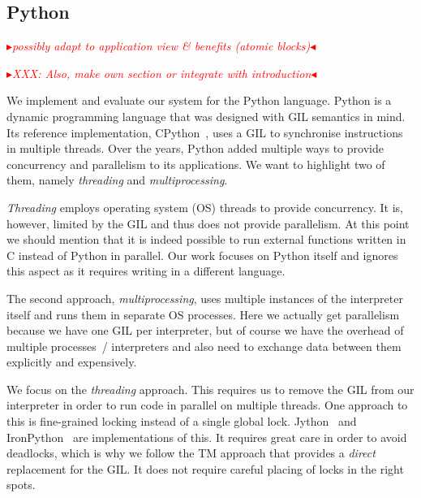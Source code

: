 \documentclass{sigplanconf}
\newcommand{\mynote}[2]{%
  \textcolor{red}{%
    \fbox{\bfseries\sffamily\scriptsize#1}%
    {\small$\blacktriangleright$\textsf{\emph{#2}}$\blacktriangleleft$}%
  }%
}
\newcommand\remi[1]{\mynote{Remi}{#1}}
\begin{document}
\subsection{Python}
\remi{possibly adapt to application view \& benefits (atomic blocks)}
\remi{XXX: Also, make own section or integrate with introduction}

We implement and evaluate our system for the Python language. Python
is a dynamic programming language that was designed with GIL semantics
in mind. Its reference implementation, CPython~\cite{cpython}, uses a
GIL to synchronise instructions in multiple threads.
Over the years, Python added multiple ways to provide concurrency and
parallelism to its applications. We want to highlight two of them,
namely \emph{threading} and \emph{multiprocessing}.

\emph{Threading} employs operating system (OS) threads to provide
concurrency. It is, however, limited by the GIL and thus does not
provide parallelism. At this point we should mention that it is indeed
possible to run external functions written in C instead of Python in
parallel. Our work focuses on Python itself and ignores this aspect as
it requires writing in a different language.

The second approach, \emph{multiprocessing}, uses multiple instances
of the interpreter itself and runs them in separate OS processes.
Here we actually get parallelism because we have one GIL per
interpreter, but of course we have the overhead of multiple processes~/
interpreters and also need to exchange data between them explicitly
and expensively.

We focus on the \emph{threading} approach. This requires us to remove
the GIL from our interpreter in order to run code in parallel on
multiple threads. One approach to this is fine-grained locking instead
of a single global lock. Jython~\cite{webjython} and
IronPython~\cite{ironpython} are implementations of this. It requires
great care in order to avoid deadlocks, which is why we follow the TM
approach that provides a \emph{direct} replacement for the GIL. It
does not require careful placing of locks in the right spots.



\end{document}
